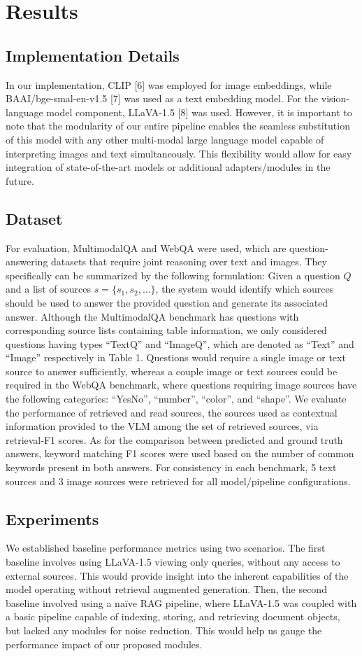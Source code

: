 \documentclass[twocolumn]{article}
\begin{document}
\section{Results}
\subsection{Implementation Details}
In our implementation, CLIP [6] was employed for image embeddings, while BAAI/bge-smal-en-v1.5 [7] was used as a text embedding model. For the vision-language model component, LLaVA-1.5 [8] was used. However, it is important to note that the modularity of our entire pipeline enables the seamless substitution of this model with any other multi-modal large language model capable of interpreting images and text simultaneously. This flexibility would allow for easy integration of state-of-the-art models or additional adapters/modules in the future.

\subsection{Dataset}
For evaluation, MultimodalQA and WebQA were used, which are question-answering datasets that require joint reasoning over text and images. They specifically can be summarized by the following formulation: Given a question \(Q\) and a list of sources \(s=\{s_1,s_2,\ldots\}\), the system would identify which sources should be used to answer the provided question and generate its associated answer. Although the MultimodalQA benchmark has questions with corresponding source lists containing table information, we only considered questions having types “TextQ” and “ImageQ”, which are denoted as “Text” and “Image” respectively in Table 1. Questions would require a single image or text source to answer sufficiently, whereas a couple image or text sources could be required in the WebQA benchmark, where questions requiring image sources have the following categories: “YesNo”, “number”, “color”, and “shape”. We evaluate the performance of retrieved and read sources, the sources used as contextual information provided to the VLM among the set of retrieved sources, via retrieval-F1 scores. As for the comparison between predicted and ground truth answers, keyword matching F1 scores were used based on the number of common keywords present in both answers. For consistency in each benchmark, 5 text sources and 3 image sources were retrieved for all model/pipeline configurations.


\subsection{Experiments}
We established baseline performance metrics using two scenarios. The first baseline involves using LLaVA-1.5 viewing only queries, without any access to external sources. This would provide insight into the inherent capabilities of the model operating without retrieval augmented generation. Then, the second baseline involved using a naïve RAG pipeline, where LLaVA-1.5 was coupled with a basic pipeline capable of indexing, storing, and retrieving document objects, but lacked any modules for noise reduction. This would help us gauge the performance impact of our proposed modules.
\end{document}
